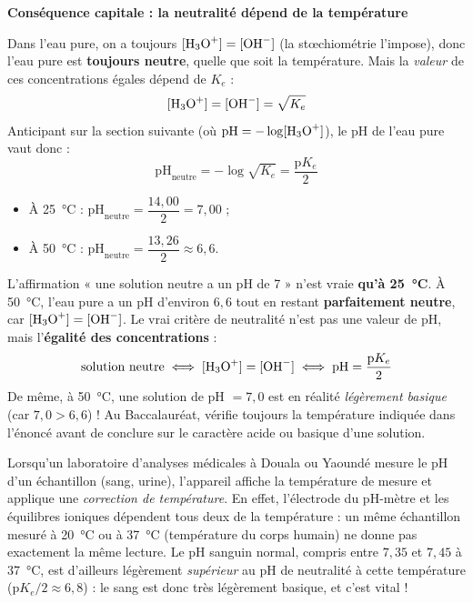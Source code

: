 \documentclass[11pt]{article}
\begin{document}
\textbf{Conséquence capitale : la neutralité dépend de la température}\par

Dans l'eau pure, on a toujours $[\ce{H3O+}] = [\ce{OH-}]$ (la stœchiométrie l'impose), donc l'eau pure est \textbf{toujours neutre}, quelle que soit la température. Mais la \emph{valeur} de ces concentrations égales dépend de $K_e$ :
\[ [\ce{H3O+}] = [\ce{OH-}] = \sqrt{K_e} \]
Anticipant sur la section suivante (où $\mathrm{pH} = -\log[\ce{H3O+}]$), le pH de l'eau pure vaut donc :
\[ \mathrm{pH}_{\text{neutre}} = -\log\sqrt{K_e} = \frac{\mathrm{p}K_e}{2} \]
\begin{itemize}
\item À \SI{25}{\celsius} : $\mathrm{pH}_{\text{neutre}} = \dfrac{14{,}00}{2} = 7{,}00$ ;
\item À \SI{50}{\celsius} : $\mathrm{pH}_{\text{neutre}} = \dfrac{13{,}26}{2} \approx 6{,}6$.
\end{itemize}

\begin{attention}[Erreur fréquente : « neutre = pH 7 » ? Pas toujours !]
L'affirmation « une solution neutre a un pH de 7 » n'est vraie \textbf{qu'à \SI{25}{\celsius}}. À \SI{50}{\celsius}, l'eau pure a un pH d'environ $6{,}6$ tout en restant \textbf{parfaitement neutre}, car $[\ce{H3O+}] = [\ce{OH-}]$. Le vrai critère de neutralité n'est pas une valeur de pH, mais l'\textbf{égalité des concentrations} :
\[ \text{solution neutre} \iff [\ce{H3O+}] = [\ce{OH-}] \iff \mathrm{pH} = \frac{\mathrm{p}K_e}{2} \]
De même, à \SI{50}{\celsius}, une solution de pH $= 7{,}0$ est en réalité \emph{légèrement basique} (car $7{,}0 > 6{,}6$) ! Au Baccalauréat, vérifie toujours la température indiquée dans l'énoncé avant de conclure sur le caractère acide ou basique d'une solution.
\end{attention}

\begin{savaistu}
Lorsqu'un laboratoire d'analyses médicales à Douala ou Yaoundé mesure le pH d'un échantillon (sang, urine), l'appareil affiche la température de mesure et applique une \emph{correction de température}. En effet, l'électrode du pH-mètre et les équilibres ioniques dépendent tous deux de la température : un même échantillon mesuré à \SI{20}{\celsius} ou à \SI{37}{\celsius} (température du corps humain) ne donne pas exactement la même lecture. Le pH sanguin normal, compris entre $7{,}35$ et $7{,}45$ à \SI{37}{\celsius}, est d'ailleurs légèrement \emph{supérieur} au pH de neutralité à cette température ($\mathrm{p}K_e/2 \approx 6{,}8$) : le sang est donc très légèrement basique, et c'est vital !
\end{savaistu}
\end{document}
